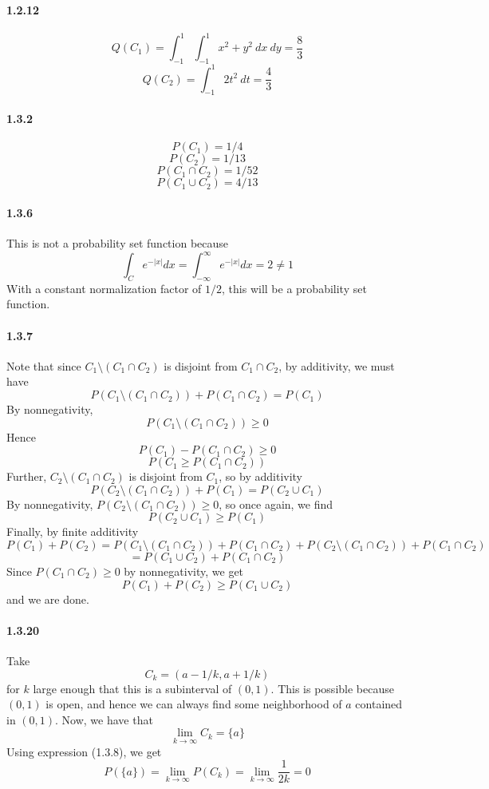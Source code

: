 \documentclass[10pt,letter]{article}
\begin{document}
\paragraph{1.2.12}
\[ Q(C_1) = \int_{-1}^1 \int_{-1}^1 x^2 + y^2 \ dx  \ dy = \frac{8}{3} \]
\[ Q(C_2) = \int_{-1}^1 2t^2 \ dt = \frac{4}{3} \]
\paragraph{1.3.2}
\[ P(C_1) = 1/4 \]
\[ P(C_2) = 1/13 \]
\[ P(C_1 \cap C_2) = 1/52 \]
\[ P(C_1 \cup C_2) = 4/13 \]
\paragraph{1.3.6}
This is not a probability set function because
\[ \int_C e^{-|x|} dx = \int_{-\infty}^\infty e^{-|x|} dx = 2 \neq 1 \]
With a constant normalization factor of $1/2$, this will be a probability set function.

\paragraph{1.3.7}
Note that since $C_1 \setminus (C_1 \cap C_2)$ is disjoint from $C_1 \cap C_2$, by additivity, we must have
\[ P(C_1 \setminus (C_1 \cap C_2)) + P(C_1 \cap C_2) = P(C_1) \]
By nonnegativity,
\[ P(C_1 \setminus (C_1 \cap C_2)) \ge 0  \]
Hence
\[ P(C_1) - P(C_1 \cap C_2) \ge 0\]
\[ P(C_1 \ge P(C_1 \cap C_2)) \]
Further, $C_2 \setminus (C_1 \cap C_2)$ is disjoint from $C_1$, so by additivity
\[ P(C_2 \setminus (C_1 \cap C_2)) + P(C_1) = P(C_2 \cup C_1) \]
By nonnegativity, $P(C_2 \setminus (C_1 \cap C_2)) \ge 0$, so once again, we find \[ P(C_2 \cup C_1) \ge P(C_1) \]
Finally, by finite additivity
\[ P(C_1) + P(C_2) = P(C_1\setminus (C_1 \cap C_2)) + P(C_1 \cap C_2)  + P(C_2 \setminus (C_1 \cap C_2)) + P(C_1 \cap C_2)\]
\[ = P(C_1 \cup C_2) + P(C_1 \cap C_2) \]
Since $P(C_1 \cap C_2) \ge 0$ by nonnegativity, we get
\[ P(C_1) + P(C_2) \ge P(C_1 \cup C_2) \]
and we are done.
\paragraph{1.3.20}
Take
\[ C_k = (a - 1/k, a + 1/k) \]
for $k$ large enough that this is a subinterval of $(0,1)$. This is possible because $(0,1)$ is open, and hence we can always find some neighborhood of $a$ contained in $(0,1)$. Now, we have that
\[ \lim_{k\to \infty} C_k = \{ a \} \]
Using expression (1.3.8), we get
\[ P(\{ a \}) = \lim_{k \to \infty} P(C_k) = \lim_{k \to \infty}\frac{1}{2k} = 0 \]
\end{document}
